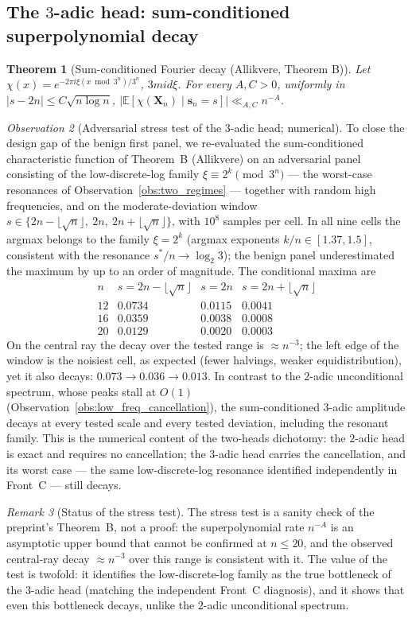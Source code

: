 \documentclass[12pt,a4paper]{article}
\newtheorem{theorem}{Theorem}[section]
\theoremstyle{remark}
\newtheorem{remark}[theorem]{Remark}
\newtheorem{observation}[theorem]{Observation}
\begin{document}
\subsection{The $3$-adic head: sum-conditioned superpolynomial decay}
\begin{theorem}[Sum-conditioned Fourier decay (Allikvere, Theorem B)]
Let $\chi(x)=e^{-2\pi i\xi(x\bmod 3^n)/3^n}$, $3
mid\xi$. For every $A,C>0$,
uniformly in $|s-2n|\le C\sqrt{n\log n}$,
$\big|\mathbb E[\chi(\mathbf X_n)\mid\mathbf s_n=s]\big|\ll_{A,C}n^{-A}$.
\end{theorem}
\begin{observation}[Adversarial stress test of the $3$-adic head; numerical]
\label{obs:stress_B}
To close the design gap of the benign first panel, we re-evaluated the
sum-conditioned characteristic function of Theorem~B (Allikvere) on an
adversarial panel consisting of the low-discrete-log family
$\xi\equiv 2^k\pmod{3^n}$ --- the worst-case resonances of
Observation~\ref{obs:two_regimes} --- together with random high frequencies,
and on the moderate-deviation window
$s\in\{2n-\lfloor\sqrt n\rfloor,\ 2n,\ 2n+\lfloor\sqrt n\rfloor\}$,
with $10^8$ samples per cell. In all nine cells the argmax belongs to the
family $\xi=2^k$ (argmax exponents $k/n\in[1.37,1.5]$, consistent with the
resonance $s^*/n\to\log_2 3$); the benign panel underestimated the maximum by
up to an order of magnitude. The conditional maxima are
\[
\begin{array}{c|ccc}
n & s=2n-\lfloor\sqrt n\rfloor & s=2n & s=2n+\lfloor\sqrt n\rfloor\\ \hline
12 & 0.0734 & 0.0115 & 0.0041\\
16 & 0.0359 & 0.0038 & 0.0008\\
20 & 0.0129 & 0.0020 & 0.0003
\end{array}
\]
On the central ray the decay over the tested range is $\approx n^{-3}$; the
left edge of the window is the noisiest cell, as expected (fewer halvings,
weaker equidistribution), yet it also decays: $0.073\to0.036\to0.013$.
In contrast to the $2$-adic unconditional spectrum, whose peaks stall at
$O(1)$ (Observation~\ref{obs:low_freq_cancellation}), the sum-conditioned
$3$-adic amplitude decays at every tested scale and every tested deviation,
including the resonant family. This is the numerical content of the two-heads
dichotomy: the $2$-adic head is exact and requires no cancellation; the
$3$-adic head carries the cancellation, and its worst case --- the same
low-discrete-log resonance identified independently in Front~C --- still
decays.
\end{observation}
\begin{remark}[Status of the stress test]
The stress test is a sanity check of the preprint's Theorem~B, not a proof:
the superpolynomial rate $n^{-A}$ is an asymptotic upper bound that cannot be
confirmed at $n\le20$, and the observed central-ray decay $\approx n^{-3}$
over this range is consistent with it. The value of the test is twofold: it
identifies the low-discrete-log family as the true bottleneck of the $3$-adic
head (matching the independent Front~C diagnosis), and it shows that even this
bottleneck decays, unlike the $2$-adic unconditional spectrum.
\end{remark}
\end{document}
